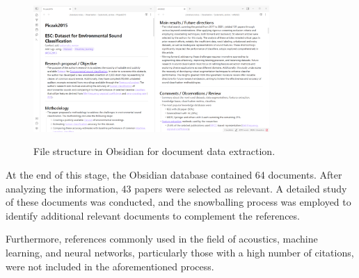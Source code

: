 \begin{figure}[htbp]
    \raggedright
        \caption{File structure in Obsidian for document data extraction.}
        \includegraphics[width=0.80\textwidth]{resources/images/080-systematic_review/Review_Obsidian_01_2023_11.png}
        \label{fig:systematic_review_methodology_obsidian}
\end{figure}

At the end of this stage, the Obsidian database contained 64 documents. After analyzing the information, 43 papers were selected as relevant. A detailed study of these documents was conducted, and the snowballing process was employed to identify additional relevant documents to complement the references.

Furthermore, references commonly used in the field of acoustics, machine learning, and neural networks, particularly those with a high number of citations, were not included in the aforementioned process.